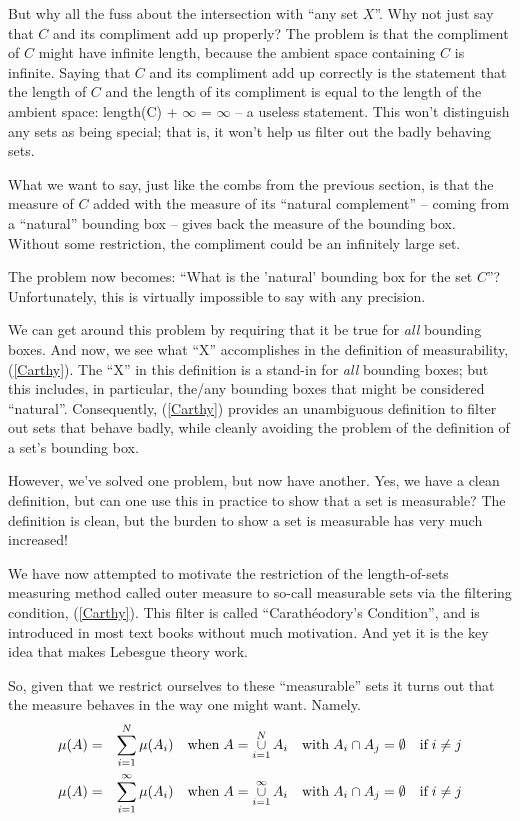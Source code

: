 \documentclass{article}
\begin{document}
But why all the fuss about the intersection with ``any set $X$''.
Why not just say that $C$ and its compliment add up properly?
The problem is that the compliment of $C$ might have infinite length, because
the ambient space containing $C$ is infinite.
Saying that $C$ and its compliment add up correctly is the statement that 
the length of $C$ and the length of its compliment is equal to the length 
of the ambient space: length(C) + $\infty$ = $\infty$ -- a useless statement.
This won't distinguish any sets as being special; that is, it won't help
us filter out the badly behaving sets.

What we want to say, just like the combs from the
previous section, is that the measure of $C$ added with the measure of its 
``natural complement'' -- coming from a ``natural'' bounding box -- 
gives back the measure of the bounding box.
Without some restriction, the compliment could be 
an infinitely large set.

The problem now becomes: ``What is the 'natural' bounding box for the set $C$''?
Unfortunately, this is virtually impossible to say with any precision.

We can get around this problem by requiring that it be true for {\em all\/} 
bounding boxes. And now, we see what ``X'' accomplishes in the definition of 
measurability, (\ref{Carthy}). The ``X'' in this definition is a stand-in for 
{\em all\/} bounding boxes; but this includes, in particular, the/any 
bounding boxes that might be considered ``natural''. 
Consequently, (\ref{Carthy}) provides an unambiguous definition to filter out 
sets that behave badly, while cleanly avoiding 
the problem of the definition of a set's bounding box.

However, we've solved one problem, but now have another. Yes, we have 
a clean definition, but can one use this in practice to show that a 
set is measurable? The definition is clean, but the burden to show a set is
measurable has very much increased!

We have now attempted to motivate the restriction of the length-of-sets 
measuring method called outer measure to so-call measurable sets via 
the filtering condition, (\ref{Carthy}).
This filter is called ``Carath\'eodory's Condition'',
and is introduced in most text books without much motivation. 
And yet it is the key idea that makes Lebesgue theory work. 
 
So, given that we restrict ourselves to these ``measurable'' sets it turns out that
the measure behaves in the way one might want. Namely.
\begin{eqnarray*}
	\mu(A) & = & \sum_{i=1}^N\limits \mu(A_i) \quad \text{when} \; 
		A = \mathop{\cup}_{i=1}^N\limits A_i \quad \text{with} \;  
		A_i \cap A_j = \emptyset \quad \text{if} \; i \neq j \\
	\mu(A) & = & \sum_{i=1}^\infty\limits \mu(A_i) \quad \text{when} \; 
		A = \mathop{\cup}_{i=1}^\infty\limits A_i \quad \text{with} \; 
		A_i \cap A_j = \emptyset \quad \text{if} \; i \neq j
\end{eqnarray*}
\end{document}
